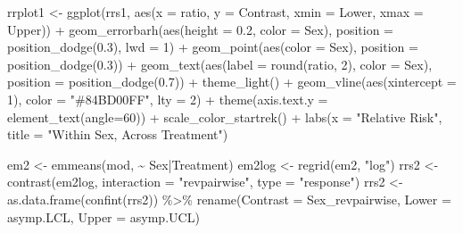 \documentclass[12pt]{article}
\newenvironment{Shaded}{\begin{snugshade}}{\end{snugshade}}
\newcommand{\AttributeTok}[1]{\textcolor[rgb]{0.77,0.63,0.00}{#1}}
\newcommand{\DecValTok}[1]{\textcolor[rgb]{0.00,0.00,0.81}{#1}}
\newcommand{\FloatTok}[1]{\textcolor[rgb]{0.00,0.00,0.81}{#1}}
\newcommand{\FunctionTok}[1]{\textcolor[rgb]{0.00,0.00,0.00}{#1}}
\newcommand{\NormalTok}[1]{#1}
\newcommand{\OtherTok}[1]{\textcolor[rgb]{0.56,0.35,0.01}{#1}}
\newcommand{\SpecialCharTok}[1]{\textcolor[rgb]{0.00,0.00,0.00}{#1}}
\newcommand{\StringTok}[1]{\textcolor[rgb]{0.31,0.60,0.02}{#1}}
\begin{document}
\begin{Shaded}
\begin{Highlighting}[]
\NormalTok{rrplot1 }\OtherTok{\textless{}{-}} \FunctionTok{ggplot}\NormalTok{(rrs1, }\FunctionTok{aes}\NormalTok{(}\AttributeTok{x =}\NormalTok{ ratio, }\AttributeTok{y =}\NormalTok{ Contrast, }\AttributeTok{xmin =}\NormalTok{ Lower, }\AttributeTok{xmax =}\NormalTok{ Upper)) }\SpecialCharTok{+}
  \FunctionTok{geom\_errorbarh}\NormalTok{(}\FunctionTok{aes}\NormalTok{(}\AttributeTok{height =} \FloatTok{0.2}\NormalTok{, }\AttributeTok{color =}\NormalTok{ Sex),}
                 \AttributeTok{position =} \FunctionTok{position\_dodge}\NormalTok{(}\FloatTok{0.3}\NormalTok{), }\AttributeTok{lwd =} \DecValTok{1}\NormalTok{) }\SpecialCharTok{+}
  \FunctionTok{geom\_point}\NormalTok{(}\FunctionTok{aes}\NormalTok{(}\AttributeTok{color =}\NormalTok{ Sex), }\AttributeTok{position =} \FunctionTok{position\_dodge}\NormalTok{(}\FloatTok{0.3}\NormalTok{)) }\SpecialCharTok{+}
  \FunctionTok{geom\_text}\NormalTok{(}\FunctionTok{aes}\NormalTok{(}\AttributeTok{label =} \FunctionTok{round}\NormalTok{(ratio, }\DecValTok{2}\NormalTok{), }\AttributeTok{color =}\NormalTok{ Sex), }
            \AttributeTok{position =} \FunctionTok{position\_dodge}\NormalTok{(}\FloatTok{0.7}\NormalTok{)) }\SpecialCharTok{+}
  \FunctionTok{theme\_light}\NormalTok{() }\SpecialCharTok{+}
  \FunctionTok{geom\_vline}\NormalTok{(}\FunctionTok{aes}\NormalTok{(}\AttributeTok{xintercept =} \DecValTok{1}\NormalTok{), }\AttributeTok{color =} \StringTok{"\#84BD00FF"}\NormalTok{, }\AttributeTok{lty =} \DecValTok{2}\NormalTok{) }\SpecialCharTok{+}
  \FunctionTok{theme}\NormalTok{(}\AttributeTok{axis.text.y =} \FunctionTok{element\_text}\NormalTok{(}\AttributeTok{angle=}\DecValTok{60}\NormalTok{)) }\SpecialCharTok{+}
  \FunctionTok{scale\_color\_startrek}\NormalTok{() }\SpecialCharTok{+}
  \FunctionTok{labs}\NormalTok{(}\AttributeTok{x =} \StringTok{"Relative Risk"}\NormalTok{,}
       \AttributeTok{title =} \StringTok{"Within Sex, Across Treatment"}\NormalTok{)}

\NormalTok{em2 }\OtherTok{\textless{}{-}} \FunctionTok{emmeans}\NormalTok{(mod, }\SpecialCharTok{\textasciitilde{}}\NormalTok{ Sex}\SpecialCharTok{|}\NormalTok{Treatment)}
\NormalTok{em2log }\OtherTok{\textless{}{-}} \FunctionTok{regrid}\NormalTok{(em2, }\StringTok{"log"}\NormalTok{)}
\NormalTok{rrs2 }\OtherTok{\textless{}{-}} \FunctionTok{contrast}\NormalTok{(em2log, }\AttributeTok{interaction =} \StringTok{"revpairwise"}\NormalTok{, }\AttributeTok{type =} \StringTok{"response"}\NormalTok{)}
\NormalTok{rrs2 }\OtherTok{\textless{}{-}} \FunctionTok{as.data.frame}\NormalTok{(}\FunctionTok{confint}\NormalTok{(rrs2)) }\SpecialCharTok{\%\textgreater{}\%}
  \FunctionTok{rename}\NormalTok{(}\AttributeTok{Contrast =}\NormalTok{ Sex\_revpairwise, }\AttributeTok{Lower =}\NormalTok{ asymp.LCL, }\AttributeTok{Upper =}\NormalTok{ asymp.UCL)}


\end{Highlighting}
\end{Shaded}
\end{document}
